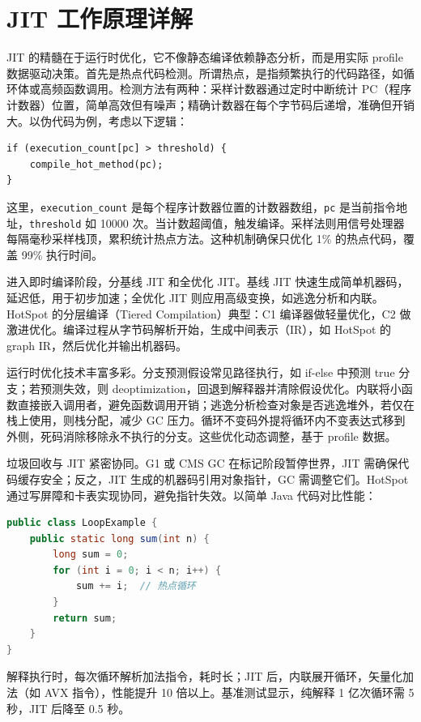 \chapter{JIT 工作原理详解}
JIT 的精髓在于运行时优化，它不像静态编译依赖静态分析，而是用实际 profile 数据驱动决策。首先是热点代码检测。所谓热点，是指频繁执行的代码路径，如循环体或高频函数调用。检测方法有两种：采样计数器通过定时中断统计 PC（程序计数器）位置，简单高效但有噪声；精确计数器在每个字节码后递增，准确但开销大。以伪代码为例，考虑以下逻辑：\par
\begin{lstlisting}
if (execution_count[pc] > threshold) {
    compile_hot_method(pc);
}
\end{lstlisting}
这里，\texttt{execution\_{}count} 是每个程序计数器位置的计数器数组，\texttt{pc} 是当前指令地址，\texttt{threshold} 如 10000 次。当计数超阈值，触发编译。采样法则用信号处理器每隔毫秒采样栈顶，累积统计热点方法。这种机制确保只优化 1\%{} 的热点代码，覆盖 99\%{} 执行时间。\par
进入即时编译阶段，分基线 JIT 和全优化 JIT。基线 JIT 快速生成简单机器码，延迟低，用于初步加速；全优化 JIT 则应用高级变换，如逃逸分析和内联。HotSpot 的分层编译（Tiered Compilation）典型：C1 编译器做轻量优化，C2 做激进优化。编译过程从字节码解析开始，生成中间表示（IR），如 HotSpot 的 graph IR，然后优化并输出机器码。\par
运行时优化技术丰富多彩。分支预测假设常见路径执行，如 if-else 中预测 true 分支；若预测失效，则 deoptimization，回退到解释器并清除假设优化。内联将小函数直接嵌入调用者，避免函数调用开销；逃逸分析检查对象是否逃逸堆外，若仅在栈上使用，则栈分配，减少 GC 压力。循环不变码外提将循环内不变表达式移到外侧，死码消除移除永不执行的分支。这些优化动态调整，基于 profile 数据。\par
垃圾回收与 JIT 紧密协同。G1 或 CMS GC 在标记阶段暂停世界，JIT 需确保代码缓存安全；反之，JIT 生成的机器码引用对象指针，GC 需调整它们。HotSpot 通过写屏障和卡表实现协同，避免指针失效。以简单 Java 代码对比性能：\par
\begin{lstlisting}[language=java]
public class LoopExample {
    public static long sum(int n) {
        long sum = 0;
        for (int i = 0; i < n; i++) {
            sum += i;  // 热点循环
        }
        return sum;
    }
}
\end{lstlisting}
解释执行时，每次循环解析加法指令，耗时长；JIT 后，内联展开循环，矢量化加法（如 AVX 指令），性能提升 10 倍以上。基准测试显示，纯解释 1 亿次循环需 5 秒，JIT 后降至 0.5 秒。\par
